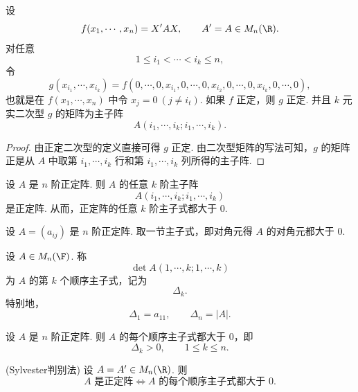 \begin{lemma}
	设
	\[
	f(x_1,\cdots,x_n)=X'AX,
	\qquad A'=A\in M_n(\R).
	\]
	对任意
	\[
	1\leq i_1<\cdots<i_k\leq n,
	\]
	令
	\[
	g(x_{i_1},\cdots,x_{i_k})
	=f(0,\cdots,0,x_{i_1},0,\cdots,0,x_{i_2},0,\cdots,0,x_{i_k},0,\cdots,0),
	\]
	也就是在 $f(x_1,\cdots,x_n)$ 中令 $x_j=0\ (j\ne i_t)$. 如果 $f$ 正定，则 $g$ 正定.
	并且 $k$ 元实二次型 $g$ 的矩阵为主子阵
	\[
	A(i_1,\cdots,i_k;i_1,\cdots,i_k).
	\]
\end{lemma}

\begin{proof}
	由正定二次型的定义直接可得 $g$ 正定. 由二次型矩阵的写法可知，$g$ 的矩阵正是从 $A$ 中取第 $i_1,\cdots,i_k$ 行和第 $i_1,\cdots,i_k$ 列所得的主子阵.
\end{proof}
\begin{corollary}
	设 $A$ 是 $n$ 阶正定阵. 则 $A$ 的任意 $k$ 阶主子阵
	\[
	A(i_1,\cdots,i_k;i_1,\cdots,i_k)
	\]
	是正定阵. 从而，正定阵的任意 $k$ 阶主子式都大于 $0$.
\end{corollary}




	设 $A=(a_{ij})$ 是 $n$ 阶正定阵. 取一节主子式，即对角元得 $A$ 的对角元都大于 $0$.


\begin{definition}\label{p1:concept:c7-l1848}
	设 $A\in M_n(\F)$. 称
	\[
	\det A(1,\cdots,k;1,\cdots,k)
	\]
	为 $A$ 的第 $k$ 个顺序主子式，记为
	\[
	\Delta_k.
	\]
	特别地，
	\[
	\Delta_1=a_{11},\qquad \Delta_n=|A|.
	\]
\end{definition}

	设 $A$ 是 $n$ 阶正定阵. 则 $A$ 的每个顺序主子式都大于 $0$，即
	\[
	\Delta_k>0,\qquad 1\leq k\leq n.
	\]
\begin{theorem}(Sylvester判别法)
	设 $A=A'\in M_n(\R)$. 则
	\[
	A\text{ 是正定阵}\Longleftrightarrow A\text{ 的每个顺序主子式都大于 }0.
	\]
\end{theorem}


